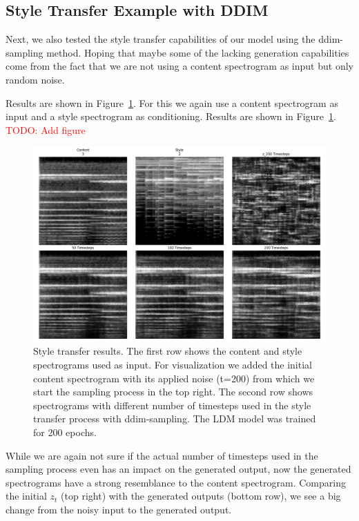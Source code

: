 \subsection{Style Transfer Example with DDIM}
Next, we also tested the style transfer capabilities of our model using the ddim-sampling method. Hoping that maybe some of the lacking generation capabilities
come from the fact that we are not using a content spectrogram as input but only random noise.

Results are shown in Figure~\ref{fig:style_transfer_results}.
For this we again use a content spectrogram as input and a style spectrogram as conditioning.
Results are shown in Figure~\ref{fig:style_transfer_results}.
\textcolor{red}{TODO: Add figure} 

\begin{figure}[h]
    \centering
    \includegraphics[width=\textwidth]{figures/content_aware_mel_spectrograms_comparison_200ep.png}
    \caption{Style transfer results. The first row shows the content and style spectrograms used as input. 
    For visualization we added the initial content spectrogram with its applied noise (t=200) from which we start the sampling process in the top right.
    The second row shows spectrograms with different number of timesteps used in the style transfer process with ddim-sampling. 
    The LDM model was trained for 200 epochs.}
    \label{fig:style_transfer_results}
\end{figure}

While we are again not sure if the actual number of timesteps used in the sampling process even has an impact on the generated output, now the
generated spectrograms have a strong resemblance to the content spectrogram. Comparing the initial \(z_t\) (top right) with the generated outputs (bottom row),
we see a big change from the noisy input to the generated output.

